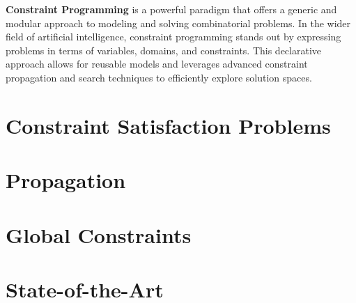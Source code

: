\textbf{Constraint Programming} \cite{HoeveK06} is a powerful paradigm that offers a generic and modular approach to modeling and solving combinatorial problems.
In the wider field of artificial intelligence, constraint programming stands out by expressing problems in terms of variables, domains, and constraints.
This declarative approach allows for reusable models and leverages advanced constraint propagation and search techniques to efficiently explore solution spaces.

\section{Constraint Satisfaction Problems}


\section{Propagation}


\section{Global Constraints}


\section{State-of-the-Art}


